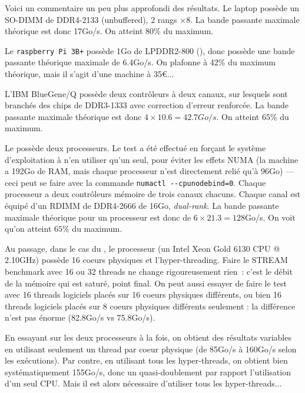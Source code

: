 \begin{danger}
  Voici un commentaire un peu plus approfondi des résultats. Le laptop possède
  un SO-DIMM de DDR4-2133 (unbuffered), 2 rangs $\times 8$. La bande passante
  maximale théorique est donc 17Go/s. On atteint $80\%$ du maximum.

  Le \texttt{raspberry Pi 3B+} possède 1Go de LPDDR2-800 (), donc possède une bande passante théorique maximale de 6.4Go/s. On
  plafonne à 42\% du maximum théorique, mais il s'agit d'une machine à
  35\euro...
  
  L'IBM BlueGene/Q possède deux contrôleurs à deux canaux, sur lesquels sont
  branchés des chips de DDR3-1333 avec correction d'erreur renforcée. La bande
  passante maximale théorique est donc $4 \times 10.6 = 42.7Go/s$. On atteint
  65\% du maximum.
  
  Le  possède deux processeurs. Le test a été effectué en
  forçant le système d'exploitation à n'en utiliser qu'un seul, pour éviter les
  effets NUMA (la machine a 192Go de RAM, mais chaque processeur n'est
  directement relié qu'à 96Go) --- ceci peut se faire avec la commande
  \verb|numactl --cpunodebind=0|. Chaque processeur a deux contrôleurs mémoire
  de trois canaux chacuns. Chaque canal est équipé d'un RDIMM de DDR4-2666 de
  16Go, \emph{dual-rank}. La bande passante maximale théorique pour un
  processeur est donc de $6 \times 21.3 = 128$Go/s. On voit qu'on atteint
  $65\%$ du maximum.
\end{danger}

\begin{ddanger}
  Au passage, dans le cas du , le processeur (un Intel
  Xeon Gold 6130 CPU @ 2.10GHz) possède 16 coeurs physiques et
  l'hyper-threading. Faire le \textsf{STREAM} benchmark avec 16 ou 32 threads ne
  change rigoureusement rien~: c'est le débit de la mémoire qui est saturé,
  point final. On peut aussi essayer de faire le test avec 16 threads logiciels
  placés sur 16 coeurs physiques différents, ou bien 16 threads logiciels placés
  sur 8 coeurs physiques différents seulement : la différence n'est pas énorme
  (82.8Go/s vs 75.8Go/s).

  En essayant sur les deux processeurs à la fois, on obtient des résultats
  variables en utilisant seulement un thread par coeur physique (de 85Go/s à
  160Go/s selon les exécutions). Par contre, en utilisant tous les
  hyper-threads, on obtient bien systématiquement 155Go/s, donc un
  quasi-doublement par rapport l'utilisation d'un seul CPU. Mais il est alors
  nécessaire d'utiliser tous les hyper-threads...
\end{ddanger}


